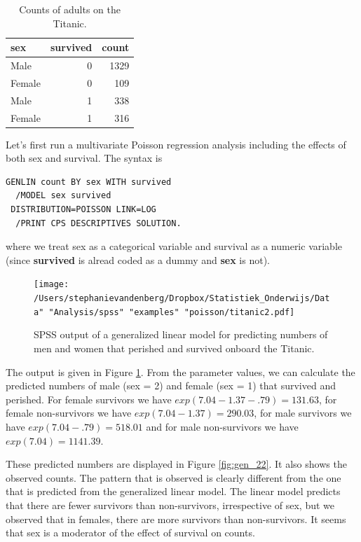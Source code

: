 \documentclass[]{book}\usepackage[]{graphicx}\usepackage[]{color}
\begin{document}
\begin{table}[ht]
\centering
\caption{Counts of adults on the Titanic.} 
\label{tab:gen_21}
\begin{tabular}{lrr}
  \hline
sex & survived & count \\ 
  \hline
Male & 0 & 1329 \\ 
  Female & 0 & 109 \\ 
  Male & 1 & 338 \\ 
  Female & 1 & 316 \\ 
   \hline
\end{tabular}
\end{table}


Let's first run a multivariate Poisson regression analysis including the effects of both sex and survival. The syntax is


\begin{verbatim}
GENLIN count BY sex WITH survived
  /MODEL sex survived
 DISTRIBUTION=POISSON LINK=LOG
  /PRINT CPS DESCRIPTIVES SOLUTION.
\end{verbatim}

where we treat sex as a categorical variable and survival as a numeric variable (since \textbf{survived} is alread coded as a dummy and \textbf{sex} is not).


\begin{figure}[h]
    \begin{center}
       \texttt{[image: /Users/stephanievandenberg/Dropbox/Statistiek\_Onderwijs/Data" "Analysis/spss" "examples" "poisson/titanic2.pdf]}
    \end{center}
     \caption{SPSS output of a generalized linear model for predicting numbers of men and women that perished and survived onboard the Titanic.}
    \label{fig:titanic2}
\end{figure}

The output is given in Figure \ref{fig:titanic2}. From the parameter values, we can calculate the predicted numbers of male (sex = 2) and female (sex = 1) that survived and perished. For female survivors we have $exp(7.04 -1.37 -.79)=131.63$, for female non-survivors we have $exp(7.04 -1.37)=290.03$, for male survivors we have $exp(7.04 -.79)=518.01$ and for male non-survivors we have $exp(7.04)=1141.39$.


These predicted numbers are displayed in Figure \ref{fig:gen_22}. It also shows the observed counts. The pattern that is observed is clearly different from the one that is predicted from the generalized linear model. The linear model predicts that there are fewer survivors than non-survivors, irrespective of sex, but we observed that in females, there are more survivors than non-survivors. It seems that sex is a moderator of the effect of survival on counts.
\end{document}
